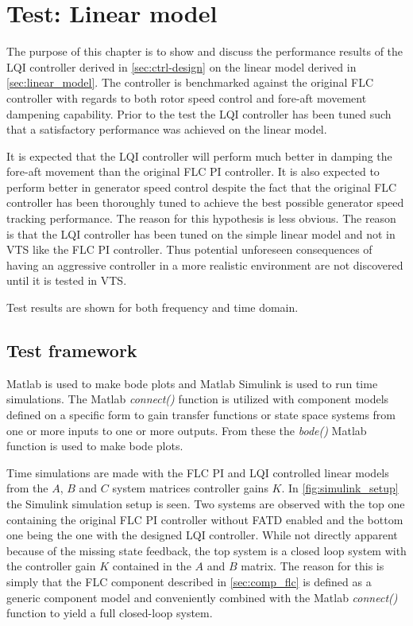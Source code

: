 \section{Test: Linear model}
The purpose of this chapter is to show and discuss the performance results of the LQI controller derived in \cref{sec:ctrl-design} on the linear model derived in \cref{sec:linear_model}. The controller is benchmarked against the original FLC controller with regards to both rotor speed control and fore-aft movement dampening capability. Prior to the test the LQI controller has been tuned such that a satisfactory performance was achieved on the linear model. 

It is expected that the LQI controller will perform much better in damping the fore-aft movement than the original FLC PI controller. It is also expected to perform better in generator speed control despite the fact that the original FLC controller has been thoroughly tuned to achieve the best possible generator speed tracking performance. The reason for this hypothesis is less obvious. The reason is that the LQI controller has been tuned on the simple linear model and not in VTS like the FLC PI controller. Thus potential unforeseen consequences of having an aggressive controller in a more realistic environment are not discovered until it is tested in VTS.

Test results are shown for both frequency and time domain.

\subsection{Test framework}
Matlab is used to make bode plots and Matlab Simulink is used to run time simulations. The Matlab \textit{connect()} function is utilized with component models defined on a specific form to gain transfer functions or state space systems from one or more inputs to one or more outputs. From these the \textit{bode()} Matlab function is used to make bode plots. 

Time simulations are made with the FLC PI and LQI controlled linear models from the $ A $, $ B $ and $ C $ system matrices controller gains $ K $. In \cref{fig:simulink_setup} the Simulink simulation setup is seen. Two systems are observed with the top one containing the original FLC PI controller without FATD enabled and the bottom one being the one with the designed LQI controller. While not directly apparent because of the missing state feedback, the top system is a closed loop system with the controller gain $ K $ contained in the $ A $ and $ B $ matrix. The reason for this is simply that the FLC component described in \cref{sec:comp_flc} is defined as a generic component model and conveniently combined with the Matlab \textit{connect()} function to yield a full closed-loop system. 

